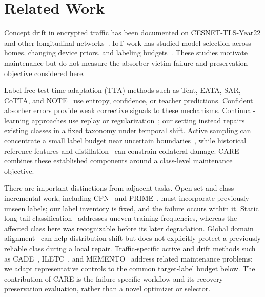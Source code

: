 \documentclass[journal]{IEEEtran}
\newcommand{\ours}{CARE}
\begin{document}
\section{Related Work}
Concept drift in encrypted traffic has been documented on CESNET-TLS-Year22 and other longitudinal networks~\cite{soukup2025drift,malekghaini2023drift,jerabek2025eval}. IoT work has studied model selection across homes, changing device priors, and labeling budgets~\cite{pashamokhtari2023dynamic,azizi2025labelshift,azizi2026budget}. These studies motivate maintenance but do not measure the absorber-victim failure and preservation objective considered here.

Label-free test-time adaptation (TTA) methods such as Tent, EATA, SAR, CoTTA, and NOTE~\cite{wang2021tent,niu2022eata,niu2023sar,wang2022cotta,gong2022note} use entropy, confidence, or teacher predictions. Confident absorber errors provide weak corrective signals to these mechanisms. Continual-learning approaches use replay or regularization~\cite{zhu2023iletc,cerasuolo2024memento,kirkpatrick2017ewc,li2018lwf}; our setting instead repairs existing classes in a fixed taxonomy under temporal shift. Active sampling can concentrate a small label budget near uncertain boundaries~\cite{settles2009active,ash2020badge}, while historical reference features and distillation~\cite{hinton2015distilling} can constrain collateral damage. \ours{} combines these established components around a class-level maintenance objective.

There are important distinctions from adjacent tasks. Open-set and class-incremental work, including CPN~\cite{cai2024cpn} and PRIME~\cite{prime2025}, must incorporate previously unseen labels; our label inventory is fixed, and the failure occurs within it. Static long-tail classification~\cite{kang2020decoupling,menon2021longtail} addresses uneven training frequencies, whereas the affected class here was recognizable before its later degradation. Global domain alignment~\cite{ganin2016dann,long2018cdan} can help distribution shift but does not explicitly protect a previously reliable class during a local repair. Traffic-specific active and drift methods such as CADE~\cite{yang2021cade}, ILETC~\cite{zhu2023iletc}, and MEMENTO~\cite{cerasuolo2024memento} address related maintenance problems; we adapt representative controls to the common target-label budget below. The contribution of \ours{} is the failure-specific workflow and its recovery--preservation evaluation, rather than a novel optimizer or selector.
\end{document}
